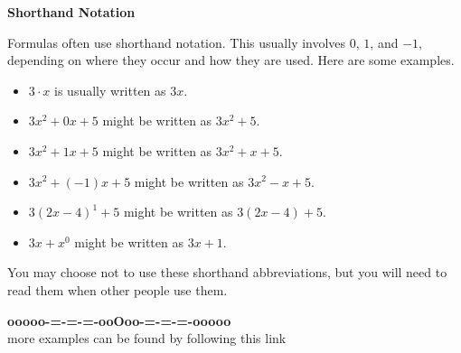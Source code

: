 \documentclass{ximera}
\begin{document}
\begin{warning} \textbf{\textcolor{red!70!darkgray}{Shorthand Notation}}  


Formulas often use shorthand notation.  This usually involves $0$, $1$, and $-1$, depending on where they occur and how they are used.  Here are some examples.


\begin{itemize}
\item $3 \cdot x$ is usually written as $3x$.
\item $3x^2 + 0 x + 5$  might be written as $3x^2 + 5$.
\item $3x^2 + 1 x + 5$  might be written as $3x^2 + x + 5$.
\item $3x^2 + (-1) x + 5$  might be written as $3x^2 - x + 5$.
\item $3(2x-4)^1 + 5$  might be written as $3(2x-4) + 5$.
\item $3x + x^0$  might be written as $3x + 1$.
\end{itemize}


You may choose not to use these shorthand abbreviations, but you will need to read them when other people use them.

\end{warning}

















\begin{center}
\textbf{\textcolor{green!50!black}{ooooo-=-=-=-ooOoo-=-=-=-ooooo}} \\

more examples can be found by following this link\\ 

\end{center}
\end{document}

